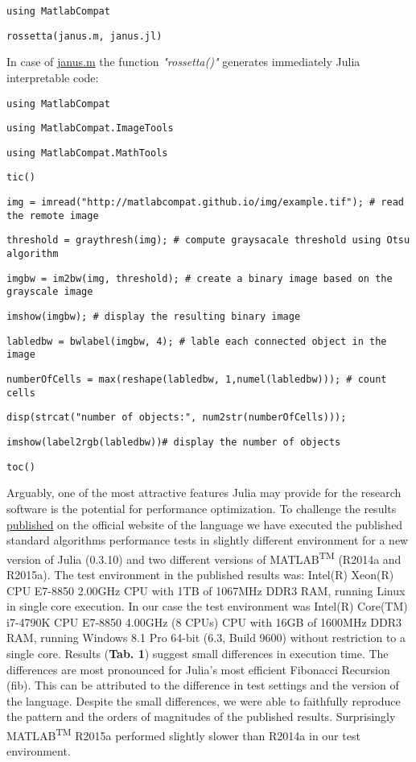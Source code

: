 \verb|using MatlabCompat|

\verb|rossetta(janus.m, janus.jl)|

In case of \href{https://github.com/MatlabCompat/MatlabCompat.jl/blob/dev/test/janus.m}{janus.m} the function \textit{"rossetta()"} generates immediately Julia interpretable code:

\verb|using MatlabCompat|

\verb|using MatlabCompat.ImageTools|

\verb|using MatlabCompat.MathTools|

\verb|tic()|

\verb|img = imread("http://matlabcompat.github.io/img/example.tif"); # read the remote image|

\verb|threshold = graythresh(img); # compute graysacale threshold using Otsu algorithm|

\verb|imgbw = im2bw(img, threshold); # create a binary image based on the grayscale image|

\verb|imshow(imgbw); # display the resulting binary image|

\verb|labledbw = bwlabel(imgbw, 4); # lable each connected object in the image|

\verb|numberOfCells = max(reshape(labledbw, 1,numel(labledbw))); # count cells|

\verb|disp(strcat("number of objects:", num2str(numberOfCells)));|

\verb|imshow(label2rgb(labledbw))# display the number of objects|

\verb|toc()|

Arguably, one of the most attractive features Julia may provide for the research software is the potential for performance optimization. To challenge the results \href{http://julialang.org/benchmarks/}{published} on the official website of the language we have executed the published standard algorithms performance tests in slightly different environment for a new version of Julia (0.3.10) and two different versions of MATLAB\textsuperscript{TM} (R2014a and R2015a). The test environment in the published results was: Intel(R) Xeon(R) CPU E7-8850 2.00GHz CPU with 1TB of 1067MHz DDR3 RAM, running Linux in single core execution. In our case the test environment was Intel(R) Core(TM) i7-4790K CPU E7-8850 4.00GHz (8 CPUs) CPU with 16GB of 1600MHz DDR3 RAM, running Windows 8.1 Pro 64-bit (6.3, Build 9600) without restriction to a single core. Results (\textbf{Tab. 1}) suggest small differences in execution time. The differences are most pronounced for Julia's most efficient Fibonacci Recursion (fib). This can be attributed to the difference in test settings and the version of the language. Despite the small differences, we were able to faithfully reproduce the pattern and the orders of magnitudes of the published results. Surprisingly MATLAB\textsuperscript{TM} R2015a performed slightly slower than R2014a in our test environment.

